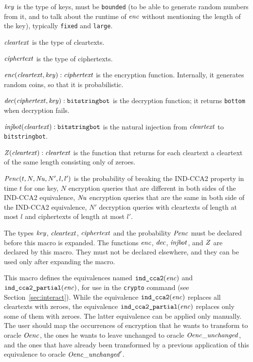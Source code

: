\documentclass{article}
\begin{document}
\begin{itemize}
   $\mathit{key}$ is the type of keys, must be \texttt{bounded} (to be able to generate random numbers from it, and to talk about the runtime of $\mathit{enc}$ without mentioning the length of the key), typically \texttt{fixed} and \texttt{large}.

   $\mathit{cleartext}$ is the type of cleartexts.

   $\mathit{ciphertext}$ is the type of ciphertexts.

   $\mathit{enc}(\mathit{cleartext}, \mathit{key}): \mathit{ciphertext}$ is the encryption function. Internally, it generates random coins, so that it is probabilistic.

   $\mathit{dec}(\mathit{ciphertext}, \mathit{key}): \texttt{bitstringbot}$ is the
  decryption function; it returns \texttt{bottom} when decryption
  fails.

   $\mathit{injbot}(\mathit{cleartext}): \texttt{bitstringbot}$ is the natural
  injection from $\mathit{cleartext}$ to \texttt{bitstringbot}.

   $\mathit{Z}(\mathit{cleartext}): \mathit{cleartext}$ is the function that
  returns for each cleartext a cleartext of the same length consisting
  only of zeroes.

  $\mathit{Penc}(t, N, \mathit{Nu}, N', l, l')$ is the probability of breaking the
  IND-CCA2 property in time $t$ for one key, $N$ encryption queries that are 
  different in both sides of the IND-CCA2 equivalence, 
  $\mathit{Nu}$ encryption queries that are the same in both side of the IND-CCA2 equivalence, $N'$
  decryption queries with cleartexts of length at most $l$ and
  ciphertexts of length at most $l'$.

   The types $\mathit{key}$, $\mathit{cleartext}$,
   $\mathit{ciphertext}$ and the probability $\mathit{Penc}$ must
   be declared before this macro is expanded. The functions
   $\mathit{enc}$, $\mathit{dec}$, $\mathit{injbot}$, and $\mathit{Z}$ are declared by this
   macro. They must not be declared elsewhere, and they can be used
   only after expanding the macro.

   This macro defines the equivalences named
   $\texttt{ind\_cca2}(\mathit{enc})$ and
   $\texttt{ind\_cca2\_partial}(\mathit{enc})$, for use in the
   \texttt{crypto} command (see Section~\ref{sec:interact}). While the
   equivalence $\texttt{ind\_cca2}(\mathit{enc})$ replaces all cleartexts
   with zeroes, the equivalence
   $\texttt{ind\_cca2\_partial}(\mathit{enc})$ replaces only some of them
   with zeroes. The latter equivalence can be applied only manually.
   The user should map the occurrences of encryption that he wants to
   transform to oracle $\mathit{Oenc}$, the ones he wants to leave unchanged to
   oracle $\mathit{Oenc\_unchanged}$, and the ones that have already been transformed
   by a previous application of this equivalence to oracle $\mathit{Oenc\_unchanged}'$.


\end{itemize}
\end{document}
